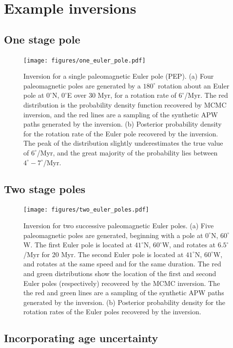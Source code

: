 \documentclass[preprint,12pt,authoryear]{elsarticle}
\begin{document}
\section{Example inversions}
\label{sec:example_inversion}


\subsection{One stage pole}
\begin{figure}
\texttt{[image: figures/one\_euler\_pole.pdf]}
\caption{Inversion for a single paleomagnetic Euler pole (PEP). (a) Four paleomagnetic poles are generated by a $180^\circ$ rotation about an Euler pole at $0^\circ$N, $0^\circ$E over 30 Myr, for a rotation rate of $6^\circ$/Myr. The red distribution is the probability density function recovered by MCMC inversion, and the red lines are a sampling of the synthetic APW paths generated by the inversion. (b) Posterior probability density for the rotation rate of the Euler pole recovered by the inversion. The peak of the distribution slightly underestimates the true value of $6^\circ$/Myr, and the great majority of the probability lies between $4^\circ-7^\circ$/Myr. }
\label{fig:one_euler_pole}
\end{figure}

\subsection{Two stage poles}
\begin{figure}
\texttt{[image: figures/two\_euler\_poles.pdf]}
\caption{Inversion for two successive paleomagnetic Euler poles. (a) Five paleomagnetic poles are generated, beginning with a pole at $0^\circ$N, $60^\circ$W. The first Euler pole is located at $41^\circ$N, $60^\circ$W, and rotates at $6.5^\circ$/Myr for 20 Myr. The second Euler pole is located at $41^\circ$N, $60^\circ$W, and rotates at the same speed and for the same duration. The red and green distributions show the location of the first and second Euler poles (respectively) recovered by the MCMC inversion. The the red and green lines are a sampling of the synthetic APW paths generated by the inversion. (b) Posterior probability density for the rotation rates of the Euler poles recovered by the inversion.}
\label{fig:two_euler_poles}
\end{figure}
\subsection{Incorporating age uncertainty}
\end{document}

